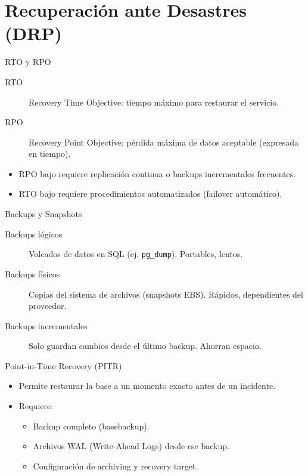 \documentclass[aspectratio=169, 10pt, xcolor=table]{beamer}
\begin{document}
\section{Recuperación ante Desastres (DRP)}

\begin{frame}{RTO y RPO}
    \begin{description}
        \item[RTO] Recovery Time Objective: tiempo máximo para restaurar el servicio.
        \item[RPO] Recovery Point Objective: pérdida máxima de datos aceptable (expresada en tiempo).
    \end{description}
    \begin{itemize}
        \item RPO bajo requiere replicación continua o backups incrementales frecuentes.
        \item RTO bajo requiere procedimientos automatizados (failover automático).
    \end{itemize}
\end{frame}

\begin{frame}{Backups y Snapshots}
    \begin{description}
        \item[Backups lógicos] Volcados de datos en SQL (ej. \texttt{pg\_dump}). Portables, lentos.
        \item[Backups físicos] Copias del sistema de archivos (snapshots EBS). Rápidos, dependientes del proveedor.
        \item[Backups incrementales] Solo guardan cambios desde el último backup. Ahorran espacio.
    \end{description}
\end{frame}

\begin{frame}{Point-in-Time Recovery (PITR)}
    \begin{itemize}
        \item Permite restaurar la base a un momento exacto antes de un incidente.
        \item Requiere:
        \begin{itemize}
            \item Backup completo (basebackup).
            \item Archivos WAL (Write-Ahead Logs) desde ese backup.
            \item Configuración de archiving y recovery target.
        \end{itemize}
    \end{itemize}
\end{frame}
\end{document}

